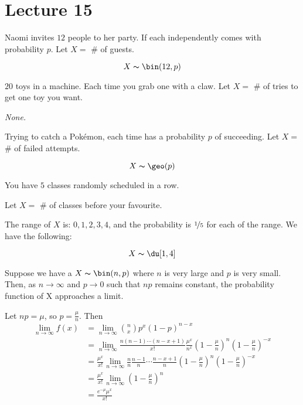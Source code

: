 \section{Lecture 15}

Naomi invites $ 12 $ people to her party. If each independently comes with
probability $ p $.
Let $ X= $ \# of guests.

\[ X \thicksim \bin(12,p) \]


$ 20 $ toys in a machine. Each time you grab one with a claw. 
Let $ X= $ \# of tries to get one toy you want.

\emph{None.}


Trying to catch a Pokémon, each time has a probability $ p $ of succeeding.
Let $ X= $ \# of failed attempts.

\[ X \thicksim \geo(p) \]


You have $ 5 $ classes randomly scheduled in a row.

Let $ X= $ \# of classes before your favourite.

The range of $ X $ is: $ 0,1,2,3,4 $, and the probability is
$ \nicefrac{1}{5} $ for each of the range. We have the following:

\[ X \thicksim \du[1,4] \]

Suppose we have a $ X \thicksim \bin(n,p) $ where $ n $ is very large
and $ p $ is very small. Then, as $ n\rightarrow \infty $ and $ p\rightarrow 0 $
such that $ np $ remains constant, the probability function of X
approaches a limit.

Let $ np=\mu $, so $ p=\frac{\mu}{n} $. Then
\begin{align*}
    \lim\limits_{{n} \to {\infty}} f\left(x\right)
    &=\lim\limits_{{n} \to {\infty}} \binom{n}{x}p^x\left(1-p\right)^{n-x}\\
    &=\lim\limits_{{n} \to {\infty}} \frac{n\left(n-1\right)\cdots\left(n-x+1\right)}{x!}
    \frac{\mu^x}{n^x} \left(1-\frac{\mu}{n}\right)^n\left(1-\frac{\mu}{n}\right)^{-x}\\
    &=\frac{\mu^x}{x!} \lim\limits_{{n} \to {\infty}} \frac{n}{n}
    \frac{n-1}{n} \cdots \frac{n-x+1}{n}\left(1-\frac{\mu}{n}\right)^n\left(1-\frac{\mu}{n}\right)^{-x}\\
    &=\frac{\mu^x}{x!} \lim\limits_{{n} \to {\infty}} \left(1-\frac{\mu}{n}\right)^n\\
    &=\frac{e^{-\mu}\mu^x}{x!}\\
\end{align*}

